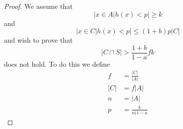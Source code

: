 \begin{proof}
    We assume that
    \begin{equation}
        |{x \in A | h(x) < p}| \ge k 
    \end{equation}
    and
    \begin{equation}
        |{x \in C | h(x) < p}| \le (1 + b)p|C| 
    \end{equation}
    and wish to prove that
    \begin{equation}
        |C \cap S| > \frac{1 + b}{1 - a}fk
    \end{equation}
    does not hold. To do this we define
    \begin{align*}
        f &= \frac{|C|}{|A|} \\
        |C| &= f |A|\\
        n &= |A|\\
        p &= \frac{k}{n(1-a}
    \end{align*}
    
\end{proof}
